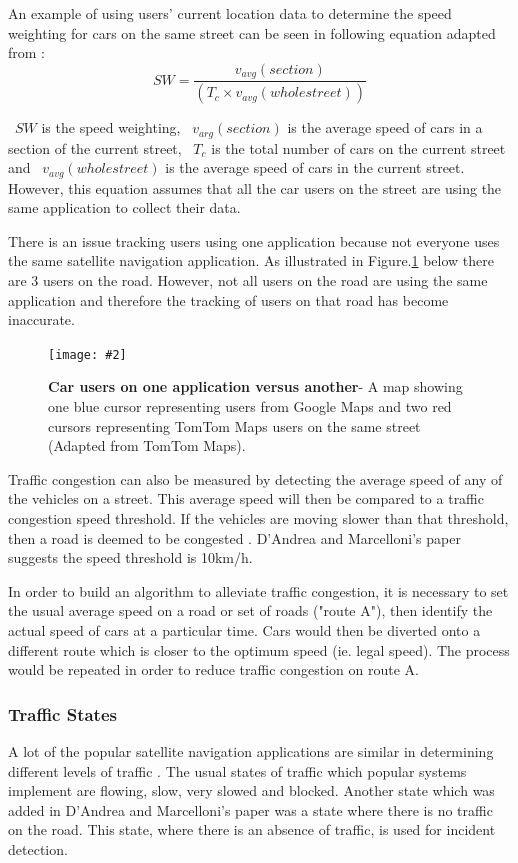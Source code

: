 \documentclass[12pt,a4paper]{article}
\newcommand{\figuremacro}[5]{
    \begin{figure}[#1]
        \centering
        \texttt{[image: \#2]}
        \caption[#3]{\textbf{#3}#4}
        \label{fig:#2}
    \end{figure}
}
\begin{document}
An example of using users’ current location data to determine the speed weighting for cars on the same street can be seen in following equation adapted from \cite{Zheng2018}: 
\[
    SW = \frac{v_{avg}(section)}{(T_c \times v_{avg}(whole street))}
\]

~$SW$ is the speed weighting, ~$v_{arg}(section)$ is the average speed of cars in a section of the current street, ~$T_c$ is the total number of cars on the current street and ~$v_{avg}(whole street)$ is the average speed of cars in the current street. However, this equation assumes that all the car users on the street are using the same application to collect their data. 

There is an issue tracking users using one application because not everyone uses the same satellite navigation application. As illustrated in Figure.\ref{fig:tomtomTracking} below there are 3 users on the road. However, not all users on the road are using the same application and therefore the tracking of users on that road has become inaccurate.

\figuremacro{h}{tomtomTracking}{Car users on one application versus another}{- A map showing one blue cursor representing users from Google Maps and two red cursors representing TomTom Maps users on the same street (Adapted from TomTom Maps).}{1.0}

Traffic congestion can also be measured by detecting the average speed of any of the vehicles on a street. This average speed will then be compared to a traffic congestion speed threshold. If the vehicles are moving slower than that threshold, then a road is deemed to be congested \cite{DAndrea2017}. D'Andrea and Marcelloni’s paper suggests the speed threshold is 10km/h.

In order to build an algorithm to alleviate traffic congestion, it is necessary to set the usual average speed on a road or set of roads ("route A"), then identify the actual speed of cars at a particular time. Cars would then be diverted onto a different route which is closer to the optimum speed (ie. legal speed). The process would be repeated in order to reduce traffic congestion on route A. \cite{Zheng2018}

\subsubsection{Traffic States}

A lot of the popular satellite navigation applications are similar in determining different levels of traffic \cite{DAndrea2017}. The usual states of traffic which popular systems implement are flowing, slow, very slowed and blocked. Another state which was added in D'Andrea and Marcelloni’s paper was a state where there is no traffic on the road. This state, where there is an absence of traffic, is used for incident detection. 
\end{document}
